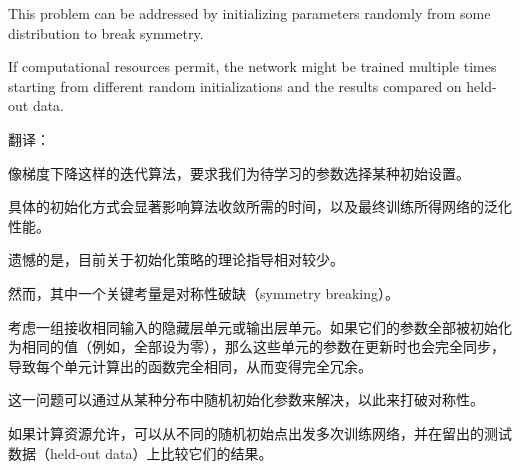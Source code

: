 \documentclass{article}
\begin{document}
This problem can be addressed by initializing parameters randomly from some distribution to break symmetry. 

If computational resources permit, the network might be trained multiple times starting from different random initializations and the results compared on held-out data.

{\color{red}
翻译：

像梯度下降这样的迭代算法，要求我们为待学习的参数选择某种初始设置。

具体的初始化方式会显著影响算法收敛所需的时间，以及最终训练所得网络的泛化性能。

遗憾的是，目前关于初始化策略的理论指导相对较少。

然而，其中一个关键考量是对称性破缺（symmetry breaking）。

考虑一组接收相同输入的隐藏层单元或输出层单元。如果它们的参数全部被初始化为相同的值（例如，全部设为零），那么这些单元的参数在更新时也会完全同步，导致每个单元计算出的函数完全相同，从而变得完全冗余。

这一问题可以通过从某种分布中随机初始化参数来解决，以此来打破对称性。

如果计算资源允许，可以从不同的随机初始点出发多次训练网络，并在留出的测试数据（held-out data）上比较它们的结果。

}
\end{document}
